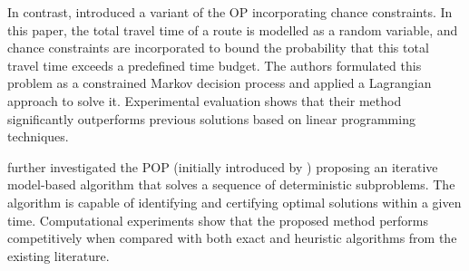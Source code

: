 \documentclass[11pt]{article}
\theoremstyle{definition}
\begin{document}


In contrast, \citet{Thayer2021} introduced a variant of the OP incorporating chance constraints. In this paper, the total travel time of a route is modelled as a random variable, and chance constraints are incorporated to bound the probability that this total travel time exceeds a predefined time budget. The authors formulated this problem as a constrained Markov decision process and applied a Lagrangian approach to solve it.
%
%
Experimental evaluation shows that their method significantly outperforms previous solutions based on linear programming techniques.

\citet{MONTEMANNI2025106947} further investigated the POP (initially introduced by \citet{Angelelli2017}) proposing an iterative model-based algorithm that solves a sequence of deterministic subproblems. The algorithm is capable of identifying and certifying optimal solutions within a given time. Computational experiments show that the proposed method performs competitively when compared with both exact and heuristic algorithms from the existing literature.
\end{document}
